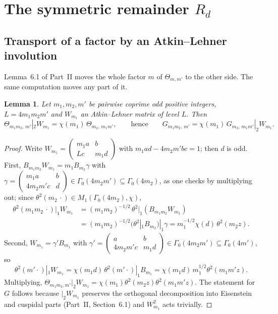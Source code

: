 \documentclass[11pt,a4paper]{article}
\newtheorem{lemma}[theorem]{Lemma}
\theoremstyle{remark}
\theoremstyle{definition}
\begin{document}
\section{The symmetric remainder $R_d$}

\subsection{Transport of a factor by an Atkin--Lehner involution}
Lemma~6.1 of Part~II moves the whole factor $m$ of $\Theta_{m,m'}$ to the other side. The same computation moves any part of it.

\begin{lemma}\label{lem:transport}
Let $m_1,m_2,m'$ be pairwise coprime odd positive integers, $L=4m_1m_2m'$ and $W_{m_1}$ an Atkin--Lehner matrix of level $L$. Then
\[
\Theta_{m_1m_2,\,m'}|_2W_{m_1}=\chi(m_1)\,\Theta_{m_2,\,m_1m'},\qquad\text{hence}\qquad G_{m_1m_2,\,m'}=\chi(m_1)\,G_{m_2,\,m_1m'}|_2W_{m_1}.
\]
\end{lemma}
\begin{proof}
Write $W_{m_1}=\left(\begin{smallmatrix}m_1a&b\\Lc&m_1d\end{smallmatrix}\right)$ with $m_1ad-4m_2m'bc=1$; then $d$ is odd. First, $B_{m_1m_2}W_{m_1}=m_1B_{m_2}\gamma$ with $\gamma=\left(\begin{smallmatrix}m_1a&b\\4m_2m'c&d\end{smallmatrix}\right)\in\Gamma_0(4m_2m')\subseteq\Gamma_0(4m_2)$, as one checks by multiplying out; since $\theta^2(m_2\,\cdot)\in M_1(\Gamma_0(4m_2),\chi)$,
\begin{align*}
\theta^2(m_1m_2\,\cdot)|_1W_{m_1}&=(m_1m_2)^{-1/2}\,\theta^2|_1(B_{m_1m_2}W_{m_1})\\
&=(m_1m_2)^{-1/2}\bigl(\theta^2|_1B_{m_2}\bigr)|_1\gamma=m_1^{-1/2}\chi(d)\,\theta^2(m_2z).
\end{align*}
Second, $W_{m_1}=\gamma'B_{m_1}$ with $\gamma'=\left(\begin{smallmatrix}a&b\\4m_2m'c&m_1d\end{smallmatrix}\right)\in\Gamma_0(4m_2m')\subseteq\Gamma_0(4m')$, so
\[
\theta^2(m'\cdot)|_1W_{m_1}=\chi(m_1d)\,\theta^2(m'\cdot)|_1B_{m_1}=\chi(m_1d)\,m_1^{1/2}\theta^2(m_1m'z).
\]
Multiplying, $\Theta_{m_1m_2,m'}|_2W_{m_1}=\chi(m_1)\theta^2(m_2z)\theta^2(m_1m'z)$. The statement for $G$ follows because $|_2W_{m_1}$ preserves the orthogonal decomposition into Eisenstein and cuspidal parts (Part~II, Section~6.1) and $W_{m_1}^2$ acts trivially.
\end{proof}
\end{document}
